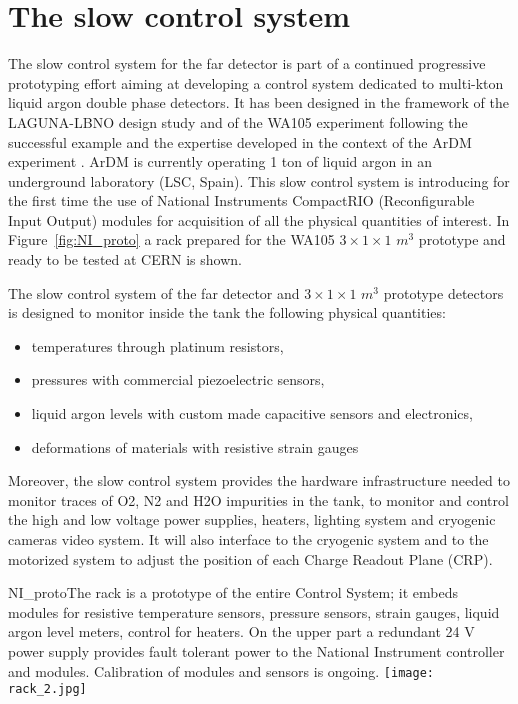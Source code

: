\section{The slow control system} 
\label{sec:detectors-fd-alt-dcs}

The slow control system for the far detector is part of a continued progressive prototyping effort aiming at developing a control system dedicated to multi-kton liquid argon double phase detectors. It has been designed in the framework of the LAGUNA-LBNO design study and of the WA105 experiment following the successful example and the expertise developed in the context of the ArDM experiment  \cite{Badertscher:2013ygt}. ArDM  is currently operating 1 ton of liquid argon in an underground laboratory (LSC, Spain). This slow control system is introducing for the first time the use of National Instruments CompactRIO (Reconfigurable Input Output) modules for acquisition of all the physical quantities of interest. In Figure~\ref{fig:NI_proto} a rack prepared for the WA105  $3 \times 1 \times 1$ $m^3$ prototype and ready to be tested at CERN is shown.

The slow control system of the far detector and $3 \times 1 \times 1$ $m^3$ prototype detectors is designed to monitor inside the tank the following physical quantities:

\begin{itemize}
 \item temperatures through platinum resistors,
 \item pressures with commercial piezoelectric sensors,
 \item liquid argon levels with custom made capacitive sensors and electronics,
 \item deformations of materials with resistive strain gauges
\end{itemize} 

Moreover, the slow control system  provides the hardware infrastructure needed to monitor traces of O2, N2 and H2O impurities in the tank, to monitor and control the high and low voltage power supplies, heaters, lighting system and cryogenic cameras video system. It will also interface to the cryogenic system and to the motorized system to adjust the position of each Charge Readout Plane (CRP). 

\begin{cdrfigure}{NI_proto}{The rack is a prototype of the entire Control System; it  embeds modules for resistive temperature sensors, pressure  sensors, strain gauges, liquid argon level meters, control for  heaters. On the upper part a redundant 24 V power supply provides
 fault tolerant power to the National Instrument controller and modules. Calibration of modules and sensors is ongoing.}
\texttt{[image: rack\_2.jpg]}
\end{cdrfigure}

